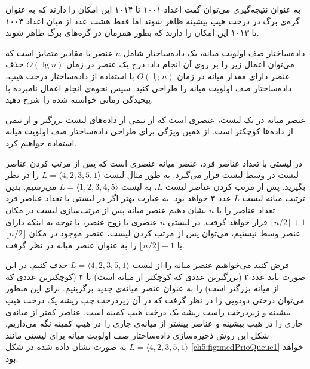 به عنوان نتیجه‌گیری می‌توان گفت اعداد ۱۰۰۱ تا ۱۰۱۴ این امکان را دارند که به عنوان گره‌ی برگ در درخت هیپ بیشینه ظاهر شوند اما فقط هشت عدد از میان اعداد ۱۰۰۳ تا ۱۰۱۳ این امکان را دارند که بطور همزمان در گره‌های برگ ظاهر شوند.

 داده‌ساختار صف اولویت میانه، یک داده‌ساختار شامل {$n$} عنصر با مقادیر متمایز است که می‌توان اعمال زیر را بر روی آن انجام داد:
 درج یک عنصر در زمان {$O(\lg n)$}
 حذف عنصر دارای مقدار میانه در زمان {$O(\lg n)$}
با استفاده از داده‌ساختار درخت هیپ، داده‌ساختار صف اولویت میانه را طراحی کنید. سپس نحوه‌ی انجام اعمال نامبرده با پیچیدگی زمانی خواسته شده را شرح دهید.


عنصر میانه در یک لیست، عنصری است که از نیمی از داده‌های لیست بزرگتر و از نیمی از داده‌ها کوچکتر است. از همین ویژگی برای طراحی داده‌ساختار صف اولویت میانه استفاده خواهیم کرد.

در لیستی با تعداد عناصر فرد، عنصر میانه عنصری است که پس از مرتب کردن عناصر لیست در وسط لیست قرار می‌گیرد. به طور مثال لیست {$L=\langle 4,2,3,5,1 \rangle$} را در نظر بگیرید. پس از مرتب کردن عناصر لیست {$L$}، به لیست {$L=\langle 1,2,3,4,5 \rangle$} می‌رسیم. بدین ترتیب میانه‌ لیست {$L$} عدد ۳ خواهد بود. به عبارت بهتر اگر در لیستی با تعداد عناصر فرد تعداد عناصر را با {$n$} نشان دهیم  عنصر میانه پس از مرتب‌سازی لیست در مکان {$\lfloor n/2 \rfloor +1$} قرار خواهد گرفت. در لیستی {$n$} عنصری با زوج عنصر، با توجه به اینکه دارای عنصر وسط نیستیم، می‌توان پس از مرتب کردن لیست، عنصر موجود در مکان {$\lfloor n/2 \rfloor$} یا {$\lfloor n/2 \rfloor +1$} را به عنوان عنصر میانه در نظر گرفت. 

فرض کنید می‌خواهیم عنصر میانه را از لیست {$L=\langle 4,2,3,5,1 \rangle$} حذف کنیم. در این صورت باید عدد ۲ (بزرگترین عددی که کوچکتر از میانه است) یا ۴ (کوچکترین عددی که از میانه بزرگتر است) را به عنوان عنصر میانه‌ی جدید برگزینیم. برای این منظور می‌توان درختی دودویی را در نظر گرفت که در آن زیردرخت چپ ریشه یک درخت هیپ بیشینه و زیردرخت راست ریشه یک درخت هیپ کمینه است. عناصر کمتر از میانه‌ی جاری را در هیپ بیشینه و عناصر بیشتر از میانه‌ی جاری را در هیپ کمینه نگه می‌داریم. شکل این روش ذخیره‌سازی داده‌ساختار صف اولویت میانه برای لیستی مانند {$L=\langle 4,2,3,5,1 \rangle$} به صورت نشان داده شده در شکل {\eqref{ch5:fig:medPrioQueue1}} خواهد بود.

